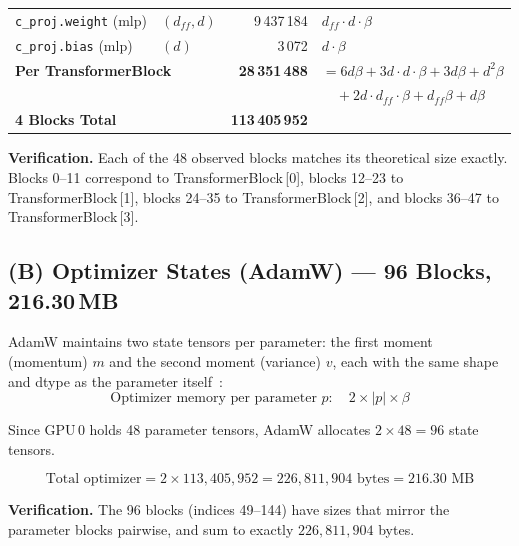 \documentclass[11pt,a4paper]{article}
\begin{document}
\begin{table}[h]
\begin{tabular}{llrl}
\texttt{c\_proj.weight} \scriptsize{(mlp)}    & $(d_{ff}, d)$ & 9\,437\,184  & $d_{ff} \cdot d \cdot \beta$ \\
\texttt{c\_proj.bias} \scriptsize{(mlp)}      & $(d)$      & 3\,072       & $d \cdot \beta$ \\
\midrule
\multicolumn{2}{l}{\textbf{Per TransformerBlock}} & \textbf{28\,351\,488} & $= 6 d\beta + 3d \cdot d \cdot \beta + 3d\beta + d^{2}\beta$ \\
 & & & $\quad + 2 d \cdot d_{ff} \cdot \beta + d_{ff}\beta + d\beta$ \\
\multicolumn{2}{l}{\textbf{4 Blocks Total}} & \textbf{113\,405\,952} & \\
\bottomrule
\end{tabular}
\end{table}

\noindent\textbf{Verification.}
Each of the 48 observed blocks matches its theoretical size exactly.
Blocks 0--11 correspond to TransformerBlock\,[0], blocks 12--23 to TransformerBlock\,[1], blocks 24--35 to TransformerBlock\,[2], and blocks 36--47 to TransformerBlock\,[3].

\subsection{(B) Optimizer States (AdamW) --- 96 Blocks, 216.30\,MB}
\label{sec:optimizer}

AdamW maintains two state tensors per parameter: the first moment (momentum) $m$ and the second moment (variance) $v$, each with the same shape and dtype as the parameter itself~\cite{loshchilov2019decoupled}:
\begin{equation}
  \text{Optimizer memory per parameter } p : \quad 2 \times |p| \times \beta
\end{equation}

Since GPU\,0 holds 48 parameter tensors, AdamW allocates $2 \times 48 = 96$ state tensors.

\begin{equation}
  \text{Total optimizer} = 2 \times 113{,}405{,}952 = 226{,}811{,}904 \text{~bytes} = 216.30 \text{~MB}
\end{equation}

\noindent\textbf{Verification.}  The 96 blocks (indices 49--144) have sizes that mirror the parameter blocks pairwise, and sum to exactly $226{,}811{,}904$ bytes.
\end{document}
